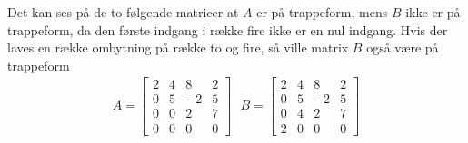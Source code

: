 \begin{eks}
Det kan ses på de to følgende matricer at $A$ er på trappeform, mens $B$ ikke er på trappeform, da den første indgang i række fire ikke er en nul indgang. Hvis der laves en række ombytning på række to og fire, så ville matrix $B$ også være på trappeform
\begin{align*}
A=
\begin{bmatrix}
2 & 4 & 8 & 2\\
0 & 5 & -2 & 5\\
0 & 0 & 2 & 7\\
0 & 0 & 0 & 0
\end{bmatrix}
\text{ }
B=
\begin{bmatrix}
2 & 4 & 8 & 2\\
0 & 5 & -2 & 5\\
0 & 4 & 2 & 7\\
2 & 0 & 0 & 0
\end{bmatrix}
\end{align*}

\end{eks}


